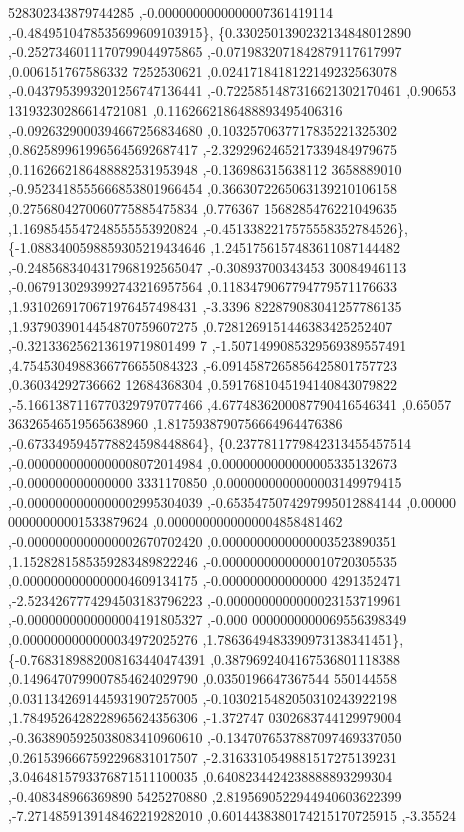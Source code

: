 \begin{DoxyCode}
      528302343879744285 ,-0.0000000000000007361419114 ,-0.4849510478535699609103915\},
\{0.3302501390232134848012890 ,-0.2527346011170799044975865 ,-0.0719832071842879117617997 ,0.006151767586332
      7252530621 ,0.0241718418122149232563078 ,-0.0437953993201256747136441 ,-0.7225851487316621302170461 ,0.90653
      13193230286614721081 ,0.1162662186488893495406316 ,-0.0926329000394667256834680 ,0.1032570637717835221325302
       ,0.8625899619965645692687417 ,-2.3292962465217339484979675 ,0.1162662186488882531953948 ,-0.136986315638112
      3658889010 ,-0.9523418555666853801966454 ,0.3663072265063139210106158 ,0.2756804270060775885475834 ,0.776367
      1568285476221049635 ,1.1698545547248555553920824 ,-0.4513382217575558352784526\},
\{-1.0883400598859305219434646 ,1.2451756157483611087144482 ,-0.2485683404317968192565047 ,-0.30893700343453
      30084946113 ,-0.0679130293992743216957564 ,0.1183479067794779571176633 ,1.9310269170671976457498431 ,-3.3396
      822879083041257786135 ,1.9379039014454870759607275 ,0.7281269151446383425252407 ,-0.321336256213619719801499
      7 ,-1.5071499085329569389557491 ,4.7545304988366776655084323 ,-6.0914587265856425801757723 ,0.36034292736662
      12684368304 ,0.5917681045194140843079822 ,-5.1661387116770329797077466 ,4.6774836200087790416546341 ,0.65057
      36326546519565638960 ,1.8175938790756664964476386 ,-0.6733495945778824598448864\},
\{0.2377811779842313455457514 ,-0.0000000000000008072014984 ,0.0000000000000005335132673 ,-0.000000000000000
      3331170850 ,0.0000000000000003149979415 ,-0.0000000000000002995304039 ,-0.6535475074297995012884144 ,0.00000
      00000000001533879624 ,0.0000000000000004858481462 ,-0.0000000000000002670702420 ,0.0000000000000003523890351
       ,1.1528281585359283489822246 ,-0.0000000000000010720305535 ,0.0000000000000004609134175 ,-0.000000000000000
      4291352471 ,-2.5234267774294503183796223 ,-0.0000000000000023153719961 ,-0.0000000000000004191805327 ,-0.000
      0000000000069556398349 ,0.0000000000000034972025276 ,1.7863649483390973138341451\},
\{-0.7683189882008163440474391 ,0.3879692404167536801118388 ,0.1496470799007854624029790 ,0.0350196647367544
      550144558 ,0.0311342691445931907257005 ,-0.1030215482050310243922198 ,1.7849526428228965624356306 ,-1.372747
      0302683744129979004 ,-0.3638905925038083410960610 ,-0.1347076537887097469337050 ,0.2615396667592296831017507
       ,-2.3163310549881517275139231 ,3.0464815793376871511100035 ,0.6408234424238888893299304 ,-0.408348966369890
      5425270880 ,2.8195690522944940603622399 ,-7.2714859139148462219282010 ,0.6014438380174215170725915 ,-3.35524

\end{DoxyCode}
